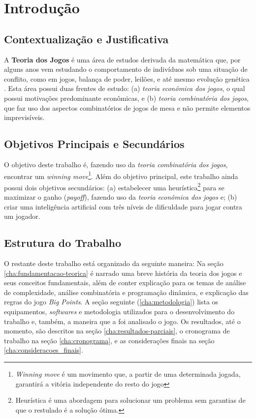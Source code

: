 \chapter[Introdução]{Introdução}
\label{introduc}

\section{Contextualização e Justificativa}

A \textbf{Teoria dos Jogos} é uma área de estudos derivada da matemática que, por alguns anos vem estudando o comportamento de indivíduos sob uma situação de conflito, como em jogos, balança de poder, leilões, e até mesmo evolução genética \cite{sartini_IIbienaldasbm}. Esta área possui duas frentes de estudo: (a) \emph{teoria econômica dos jogos}, o qual possui motivações predominante econômicas, e (b) \emph{teoria combinatória dos jogos}, que faz uso dos aspectos combinatórios de jogos de mesa e não permite elementos imprevisíveis.

\section{Objetivos Principais e Secundários}

O objetivo deste trabalho é, fazendo uso da \emph{teoria combinatória dos jogos}, encontrar um \emph{winning move}\footnote{\emph{Winning move} é um movimento que, a partir de uma determinada jogada, garantirá a vitória independente do resto do jogo}. Além do objetivo principal, este trabalho ainda possui dois objetivos secundários: (a) estabelecer uma heurística\footnote{Heurística é uma abordagem para solucionar um problema sem garantias de que o restulado é a solução ótima.} para se maximizar o ganho (\emph{payoff}), fazendo uso da \emph{teoria econômica dos jogos} e; (b) criar uma inteligência artificial com três níveis de dificuldade para jogar contra um jogador.

\section{Estrutura do Trabalho}

O restante deste trabalho está organizado da seguinte maneira: Na seção \ref{cha:fundamentacao-teorica} é narrado uma breve história da teoria dos jogos e seus conceitos fundamentais, além de conter explicação para os temas de análise de complexidade, análise combinatória e programação dinâmica, e explicação das regras do jogo \emph{Big Points}. A seção seguinte (\ref{cha:metodologia}) lista os equipamentos, \textit{softwares} e metodologia utilizados para o desenvolvimento do trabalho e, também, a maneira que a foi analisado o jogo. Os resultados, até o momento, são descritos na seção \ref{cha:resultados-parciais}, o cronograma de trabalho na seção \ref{cha:cronograma}, e as considerações finais na seção \ref{cha:consideracoes_finais}.
